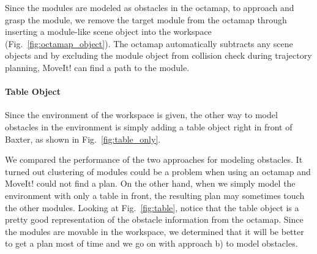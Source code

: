 Since the modules are modeled as obstacles in the octamap, to approach and grasp the module, we remove the target module from the octamap through inserting a module-like scene object into the workspace (Fig.~\ref{fig:octamap_object}). The octamap automatically subtracts any scene objects and by excluding the module object from collision check during trajectory planning, MoveIt! can find a path to the module.

\paragraph{Table Object}\label{obstacle-table}
Since the environment of the workspace is given, the other way to model obstacles in the environment is simply adding a table object right in front of Baxter, as shown in Fig.~\ref{fig:table_only}. 

We compared the performance of the two approaches for modeling obstacles. It turned out clustering of modules could be a problem when using an octamap and MoveIt! could not find a plan. On the other hand, when we simply model the environment with only a table in front, the resulting plan may sometimes touch the other modules. Looking at Fig.~\ref{fig:table}, notice that the table object is a pretty good representation of the obstacle information from the octamap. Since the modules are movable in the workspace, we determined that it will be better to get a plan most of time and we go on with approach b) to model obstacles. 

